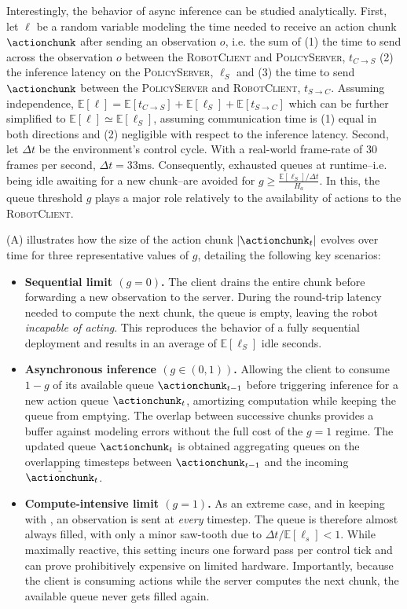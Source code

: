 Interestingly, the behavior of async inference can be studied analytically. First, let \( \ell \) be a random variable modeling the time needed to receive an action chunk \( \actionchunk \) after sending an observation \( o \), i.e. the sum of (1) the time to send across the observation \( o \) between the \textsc{RobotClient} and \textsc{PolicyServer}, \( t_{C \to S}\) (2) the inference latency on the \textsc{PolicyServer}, \( \ell_S \) and (3) the time to send \( \actionchunk \) between the \textsc{PolicyServer} and \textsc{RobotClient}, \( t_{S \to C} \). Assuming independence, \( \mathbb E [\ell] = \mathbb E[t_{C \to S}] + \mathbb E[\ell_S] + \mathbb E[t_{S \to C}] \) which can be further simplified to \( \mathbb E[\ell] \simeq \mathbb E[\ell_S]  \), assuming communication time is (1) equal in both directions and (2) negligible with respect to the inference latency. Second, let \(\Delta t\) be the environment’s control cycle. With a real-world frame-rate of 30 frames per second, \(\Delta t=33\text{ms}\). Consequently, exhausted queues at runtime--i.e. being idle awaiting for a new chunk--are avoided for \( g \geq \frac{\mathbb E[\ell_S] / \Delta t}{H_a} \). In this, the queue threshold \( g \) plays a major role relatively to the availability of actions to the \textsc{RobotClient}.

(A) illustrates how the size of the action chunk \(\lvert \actionchunk_t \rvert\) evolves over time for three representative values of \(g\), detailing the following key scenarios:
\begin{itemize}
    \item \textbf{Sequential limit \((g=0)\).} The client drains the entire chunk before forwarding a new observation to the server. During the round-trip latency needed to compute the next chunk, the queue is empty, leaving the robot \emph{incapable of acting}.  This reproduces the behavior of a fully sequential deployment and results in an average of \( \mathbb E[\ell_S] \) idle seconds.
    \item \textbf{Asynchronous inference \((g \in (0,1))\).} Allowing the client to consume \(1-g\) of its available queue \( \actionchunk_{t-1}\) before triggering inference for a new action queue \( \actionchunk_{t} \), amortizing computation while keeping the queue from emptying. The overlap between successive chunks provides a buffer against modeling errors without the full cost of the \(g=1\) regime. The updated queue \( \actionchunk_t\) is obtained aggregating queues on the overlapping timesteps between \( \actionchunk_{t-1}\) and the incoming \(\tilde{\actionchunk}_{t}\).
    \item \textbf{Compute-intensive limit \((g=1)\).}  As an extreme case, and in keeping with \citet{zhaoLearningFineGrainedBimanual2023}, an observation is sent at \emph{every} timestep. The queue is therefore almost always filled, with only a minor saw-tooth due to \(\Delta t/\mathbb E[\ell_s] < 1\). While maximally reactive, this setting incurs one forward pass per control tick and can prove prohibitively expensive on limited hardware. Importantly, because the client is consuming actions while the server computes the next chunk, the available queue never gets filled again.
\end{itemize}

